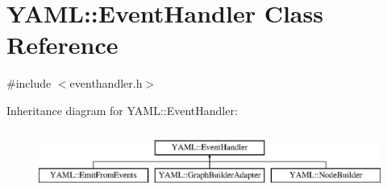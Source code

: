 \hypertarget{class_y_a_m_l_1_1_event_handler}{}\section{Y\+A\+ML\+::Event\+Handler Class Reference}
\label{class_y_a_m_l_1_1_event_handler}


{\ttfamily \#include $<$eventhandler.\+h$>$}

Inheritance diagram for Y\+A\+ML\+::Event\+Handler\+:\begin{figure}[H]
\begin{center}
\leavevmode
\includegraphics[height=2.000000cm]{class_y_a_m_l_1_1_event_handler}
\end{center}
\end{figure}
